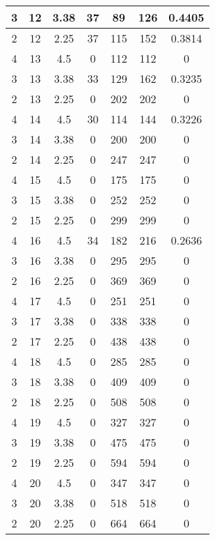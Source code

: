 \documentclass[letterpaper, 12pt]{article}
\begin{document}
\begin{longtable}{|c|c|c|c|c|c|c|}
\hline
3 & 12 & 3.38 & 37 & 89 & 126 & 0.4405 \\
\hline
2 & 12 & 2.25 & 37 & 115 & 152 & 0.3814 \\
\hline
4 & 13 & 4.5 & 0 & 112 & 112 & 0 \\
\hline
3 & 13 & 3.38 & 33 & 129 & 162 & 0.3235 \\
\hline
2 & 13 & 2.25 & 0 & 202 & 202 & 0 \\
\hline
4 & 14 & 4.5 & 30 & 114 & 144 & 0.3226 \\
\hline
3 & 14 & 3.38 & 0 & 200 & 200 & 0 \\
\hline
2 & 14 & 2.25 & 0 & 247 & 247 & 0 \\
\hline
4 & 15 & 4.5 & 0 & 175 & 175 & 0 \\
\hline
3 & 15 & 3.38 & 0 & 252 & 252 & 0 \\
\hline
2 & 15 & 2.25 & 0 & 299 & 299 & 0 \\
\hline
4 & 16 & 4.5 & 34 & 182 & 216 & 0.2636 \\
\hline
3 & 16 & 3.38 & 0 & 295 & 295 & 0 \\
\hline
2 & 16 & 2.25 & 0 & 369 & 369 & 0 \\
\hline
4 & 17 & 4.5 & 0 & 251 & 251 & 0 \\
\hline
3 & 17 & 3.38 & 0 & 338 & 338 & 0 \\
\hline
2 & 17 & 2.25 & 0 & 438 & 438 & 0 \\
\hline
4 & 18 & 4.5 & 0 & 285 & 285 & 0 \\
\hline
3 & 18 & 3.38 & 0 & 409 & 409 & 0 \\
\hline
2 & 18 & 2.25 & 0 & 508 & 508 & 0 \\
\hline
4 & 19 & 4.5 & 0 & 327 & 327 & 0 \\
\hline
3 & 19 & 3.38 & 0 & 475 & 475 & 0 \\
\hline
2 & 19 & 2.25 & 0 & 594 & 594 & 0 \\
\hline
4 & 20 & 4.5 & 0 & 347 & 347 & 0 \\
\hline
3 & 20 & 3.38 & 0 & 518 & 518 & 0 \\
\hline
2 & 20 & 2.25 & 0 & 664 & 664 & 0 \\
\hline
\end{longtable}
\end{document}
